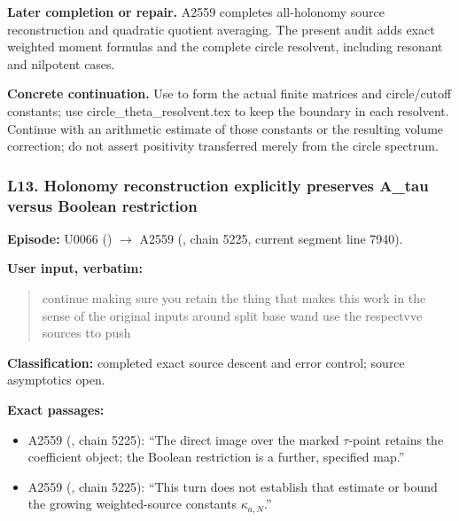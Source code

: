 \textbf{Later completion or repair.} A2559 completes all-holonomy source
reconstruction and quadratic quotient averaging. The present audit adds
exact weighted moment formulas and the complete circle resolvent,
including resonant and nilpotent cases.

\textbf{Concrete continuation.} Use
\protect{} to form the actual
finite matrices and circle/cutoff constants; use
circle\_theta\_resolvent.tex to keep the boundary in each resolvent.
Continue with an arithmetic estimate of those constants or the resulting
volume correction; do not assert positivity transferred merely from the
circle spectrum.

\subsubsection{L13. Holonomy reconstruction explicitly preserves A\_tau
versus Boolean
restriction}\label{l13.-holonomy-reconstruction-explicitly-preserves-a_tau-versus-boolean-restriction}

\textbf{Episode:} U0066
(\protect{})
\allowbreak{}\ensuremath{→}\allowbreak{} A2559
(\protect{}, chain 5225,
current segment line 7940).

\textbf{User input, verbatim:}

\begin{quote}
continue making sure you retain the thing that makes this work in the
sense of the original inputs around split base wand use the respectvve
sources tto push
\end{quote}

\textbf{Classification:} completed exact source descent and error
control; source asymptotics open.

\textbf{Exact passages:}

\begin{itemize}
\tightlist
\item
  A2559 (\protect{}, chain
  5225): ``The direct image over the marked \(\tau\)-point retains the
  coefficient object; the Boolean restriction is a further, specified
  map.''
\item
  A2559 (\protect{}, chain
  5225): ``This turn does not establish that estimate or bound the
  growing weighted-source constants \(\kappa_{a,N}\).''
\end{itemize}

